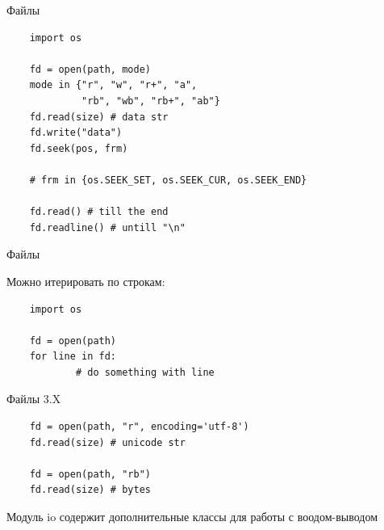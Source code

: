 \documentclass{article}
\begin{document}
\begin{center} Файлы \end{center}

\begin{lstlisting}
	import os

    fd = open(path, mode)
    mode in {"r", "w", "r+", "a", 
             "rb", "wb", "rb+", "ab"}
	fd.read(size) # data str
	fd.write("data")
	fd.seek(pos, frm)
	
	# frm in {os.SEEK_SET, os.SEEK_CUR, os.SEEK_END}
	
	fd.read() # till the end
	fd.readline() # untill "\n"
\end{lstlisting}
\newpage

\begin{center} Файлы \end{center}
Можно итерировать по строкам:
\begin{lstlisting}
	import os

    fd = open(path)
    for line in fd:
        	# do something with line
\end{lstlisting}
\newpage

\begin{center} Файлы 3.X \end{center}
\begin{lstlisting}
    fd = open(path, "r", encoding='utf-8')
	fd.read(size) # unicode str

    fd = open(path, "rb")
	fd.read(size) # bytes
\end{lstlisting}
Модуль io содержит дополнительные классы для работы с воодом-выводом
\newpage

\end{document}
